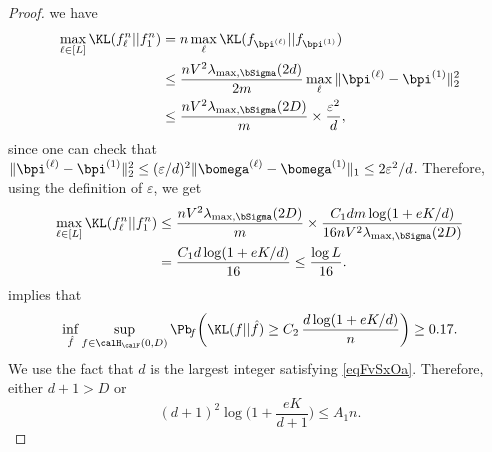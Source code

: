 \begin{proof}
we have
\begin{align}
\max_{\ell\in[L]}\KL(f^n_{\ell}||f^n_{1}) &= n\max_{\ell}\KL(f_{\bpi^{(\ell)}}||f_{\bpi^{(1)}})\\
&\leq \frac{ n V^2\lambda_{\max,\bSigma}(2d)}{2m}\max_\ell \|\bpi^{(\ell)} - \bpi^{(1)}\|_2^2\\
&\leq \frac{ n V^2\lambda_{\max,\bSigma}(2D)}{m} \times \frac{\varepsilon^2}{d},
\end{align}
since one can check that $\|\bpi^{(\ell)} - \bpi^{(1)}\|_2^2 \le (\varepsilon/d)^2 
\|\bomega^{(\ell)}-\bomega^{(1)}\|_1\le 2\varepsilon^2/d$. Therefore, using the definition 
of $\varepsilon$, we get
\begin{align}
\max_{\ell\in[L]}\KL(f^n_{\ell}||f^n_{1}) 
    &\le \frac{ n V^2\lambda_{\max,\bSigma}(2D)}{m}\times\frac{C_1dm\log(1+e  K/d)}
        {16 nV^2\lambda_{\max,\bSigma}(2D)}\\
    &= \frac{C_1d\log(1+e  K/d)}{16}\le \frac{\log L}{16}.
\end{align}
 implies that
\begin{equation}\label{eqFvSxTwa}
\inf_{\hat f}\sup_{f \in \calH_\calF(0,D)}\Pb\!_{f}\bigg(\KL(f||\hat f)\geq
C_2\,\frac{d\log(1+e  K/d)}{n}\bigg)\geq 0.17.
\end{equation}
We use the fact that $d$ is the largest integer satisfying 
\eqref{eqFvSxOa}. Therefore, either $d+1>D$ or 
\begin{equation}\label{eqFvSxTha}
(d+1)^2\log\Big(1+\frac{e  K}{d+1}\Big)\le A_1 n.

\end{equation}
\end{proof}
